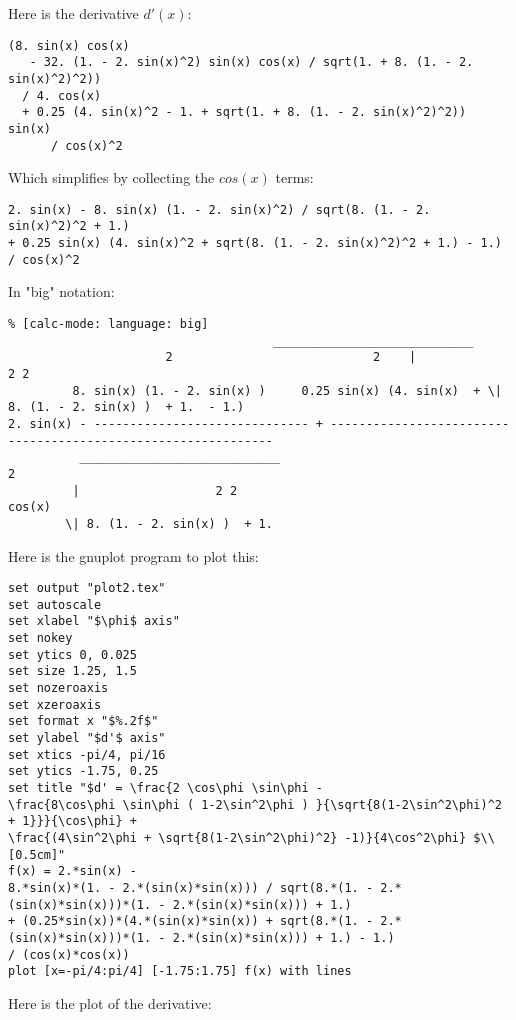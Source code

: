 Here is the derivative $d'(x)$:
\begin{verbatim}
(8. sin(x) cos(x) 
   - 32. (1. - 2. sin(x)^2) sin(x) cos(x) / sqrt(1. + 8. (1. - 2. sin(x)^2)^2)) 
  / 4. cos(x) 
  + 0.25 (4. sin(x)^2 - 1. + sqrt(1. + 8. (1. - 2. sin(x)^2)^2)) sin(x) 
      / cos(x)^2
\end{verbatim}

Which simplifies by collecting the $cos(x)$ terms:
\begin{verbatim}
2. sin(x) - 8. sin(x) (1. - 2. sin(x)^2) / sqrt(8. (1. - 2.  sin(x)^2)^2 + 1.)
+ 0.25 sin(x) (4. sin(x)^2 + sqrt(8. (1. - 2. sin(x)^2)^2 + 1.) - 1.) / cos(x)^2
\end{verbatim}
In "big" notation:
\begin{verbatim}
% [calc-mode: language: big]
									 ____________________________
				      2                            2    |                   2 2
	     8. sin(x) (1. - 2. sin(x) )     0.25 sin(x) (4. sin(x)  + \| 8. (1. - 2. sin(x) )  + 1.  - 1.)
2. sin(x) - ------------------------------ + --------------------------------------------------------------
	      ____________________________                                    2
	     |                   2 2                                    cos(x)
	    \| 8. (1. - 2. sin(x) )  + 1.
\end{verbatim}
\newpage
Here is the gnuplot program to plot this:
\begin{verbatim}
set output "plot2.tex"
set autoscale
set xlabel "$\phi$ axis"
set nokey
set ytics 0, 0.025
set size 1.25, 1.5
set nozeroaxis
set xzeroaxis
set format x "$%.2f$"
set ylabel "$d'$ axis"
set xtics -pi/4, pi/16
set ytics -1.75, 0.25
set title "$d' = \frac{2 \cos\phi \sin\phi -
\frac{8\cos\phi \sin\phi ( 1-2\sin^2\phi ) }{\sqrt{8(1-2\sin^2\phi)^2 + 1}}}{\cos\phi} +
\frac{(4\sin^2\phi + \sqrt{8(1-2\sin^2\phi)^2} -1)}{4\cos^2\phi} $\\[0.5cm]"
f(x) = 2.*sin(x) -
8.*sin(x)*(1. - 2.*(sin(x)*sin(x))) / sqrt(8.*(1. - 2.*(sin(x)*sin(x)))*(1. - 2.*(sin(x)*sin(x))) + 1.)
+ (0.25*sin(x))*(4.*(sin(x)*sin(x)) + sqrt(8.*(1. - 2.*(sin(x)*sin(x)))*(1. - 2.*(sin(x)*sin(x))) + 1.) - 1.)
/ (cos(x)*cos(x))
plot [x=-pi/4:pi/4] [-1.75:1.75] f(x) with lines
\end{verbatim}
Here is the plot of the derivative:
\begin{center}
	
\end{center}

